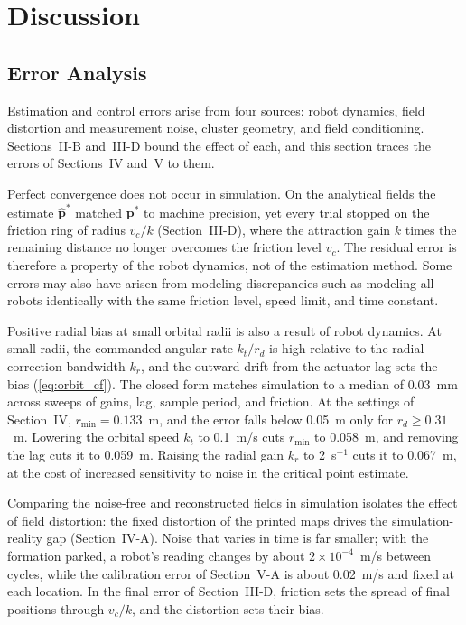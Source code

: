 \documentclass[lettersize,journal]{IEEEtran}
\newcommand{\rev}[1]{#1}
\begin{document}
\section{Discussion}

\subsection{Error Analysis}

Estimation and control errors arise from four sources: robot dynamics, field distortion and measurement noise, cluster geometry, and field conditioning. Sections~II-B and~III-D bound the effect of each, and this section traces the errors of Sections~IV and~V to them.

Perfect convergence does not occur in simulation. On the analytical fields the estimate $\hat{\mathbf{p}}^*$ matched $\mathbf{p}^*$ to machine precision, yet every trial stopped on the friction ring of radius $v_c/k$ (Section~III-D), where the attraction gain $k$ times the remaining distance no longer overcomes the friction level $v_c$. The residual error is therefore a property of the robot dynamics, not of the estimation method. Some errors may also have arisen from modeling discrepancies such as modeling all robots identically with the same friction level, speed limit, and time constant.

Positive radial bias at small orbital radii is also a result of robot dynamics. At small radii, the commanded angular rate $k_t / r_d$ is high relative to the radial correction bandwidth $k_r$, and the outward drift from the actuator lag sets the bias (\ref{eq:orbit_cf}). The closed form matches simulation to a median of \rev{0.03}~mm across sweeps of gains, lag, sample period, and friction. At the settings of Section~IV, $r_{\min} = \rev{0.133}$~m, and the error falls below 0.05~m only for $r_d \ge \rev{0.31}$~m. Lowering the orbital speed $k_t$ to 0.1~m/s cuts $r_{\min}$ to \rev{0.058}~m, and removing the lag cuts it to \rev{0.059}~m. Raising the radial gain $k_r$ to 2~s$^{-1}$ cuts it to \rev{0.067}~m, at the cost of increased sensitivity to noise in the critical point estimate.

Comparing the noise-free and reconstructed fields in simulation isolates the effect of field distortion: the fixed distortion of the printed maps drives the simulation-reality gap (Section~IV-A). Noise that varies in time is far smaller; with the formation parked, a robot's reading changes by about \rev{$2\times10^{-4}$}~m/s between cycles, while the calibration error of Section~V-A is about 0.02~m/s and fixed at each location. In the final error of Section~III-D, friction sets the spread of final positions through $v_c/k$, and the distortion sets their bias.
\end{document}
